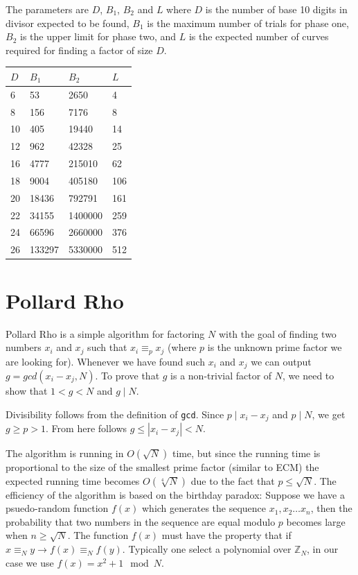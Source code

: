 \documentclass{article}
\begin{document}
The parameters are $D$, $B_1$, $B_2$ and $L$ where $D$ is the number of base 10 digits in divisor expected to be found, $B_1$ is the maximum number of trials for phase one, $B_2$ is the upper limit for phase two, and $L$ is the expected number of curves required for finding a factor of size $D$. 

\begin{table}[ht]
\label{param-ecm-table}
\begin{tabular}{|l|l|l|l|}
\hline
$D$& $B_1$  & $B_2$   & $L$ \\ \hline
6  & 53     & 2650    & 4   \\ \hline
8  & 156    & 7176    & 8   \\ \hline
10 & 405    & 19440   & 14  \\ \hline
12 & 962    & 42328   & 25  \\ \hline
16 & 4777   & 215010  & 62  \\ \hline
18 & 9004   & 405180  & 106 \\ \hline
20 & 18436  & 792791  & 161 \\ \hline
22 & 34155  & 1400000 & 259 \\ \hline
24 & 66596  & 2660000 & 376 \\ \hline
26 & 133297 & 5330000 & 512 \\ \hline
\end{tabular}
\end{table}

\section{Pollard Rho}
\label{pollard}
Pollard Rho is a simple algorithm for factoring $N$ with the goal of finding two numbers $x_i$ and $x_j$ such that $x_i \equiv_p x_j$ (where $p$ is the unknown prime factor we are looking for). Whenever we have found such $x_i$ and $x_j$ we can output $g = gcd(x_i - x_j, N)$. To prove that $g$ is a non-trivial factor of $N$, we need to show that $1 < g < N$ and $g \mid N$. 

Divisibility follows from the definition of \verb!gcd!. Since $p \mid x_i-x_j$ and $p \mid N$, we get $g \ge p > 1$. From here follows $g \le |x_i-x_j| < N$.

The algorithm is running in $O(\sqrt{N})$ time, but since the running time is proportional to the size of the smallest prime factor (similar to ECM) the expected running time becomes $O(\sqrt[4]{N})$ due to the fact that $p \le \sqrt{N}$. The efficiency of the algorithm is based on the birthday paradox: Suppose we have a psuedo-random function $f(x)$ which generates the sequence $x_1, x_2\ldots x_n$, then the probability that two numbers in the sequence are equal modulo $p$ becomes large when $n \ge \sqrt{N}$. The function $f(x)$ must have the property that if $x \equiv_N y \rightarrow f(x) \equiv_N f(y)$. Typically one select a polynomial over $\mathbb{Z}_N$, in our case we use $f(x)=x^2+1 \mod N$.
\end{document}
